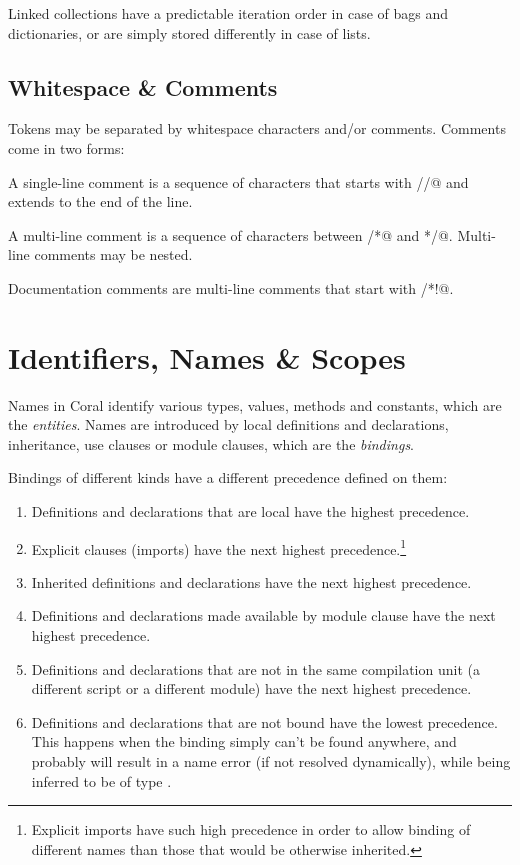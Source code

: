 Linked collections have a predictable iteration order in case of bags and dictionaries, or are simply stored differently in case of lists.  

\section{Whitespace \& Comments}\label{sec:whitespacecomments}

Tokens may be separated by whitespace characters and/or comments. Comments come in two forms: 

A single-line comment is a sequence of characters that starts with \lstinline@//@ and extends to the end of the line. 

A multi-line comment is a sequence of characters between \lstinline@/*@ and \lstinline@*/@. Multi-line comments may be nested. 

Documentation comments are multi-line comments that start with \lstinline@/*!@. 

\chapter{Identifiers, Names \& Scopes}

Names in Coral identify various types, values, methods and constants, which are the \emph{entities}. Names are introduced by local definitions and declarations, inheritance, use clauses or module clauses, which are the \emph{bindings}. 

Bindings of different kinds have a different precedence defined on them: 

\begin{enumerate}
\item Definitions and declarations that are local have the highest precedence. 
\item Explicit \lstinline@use@ clauses (imports) have the next highest precedence.\footnote{Explicit imports have such high precedence in order to allow binding of different names than those that would be otherwise inherited.} 
\item Inherited definitions and declarations have the next highest precedence. 
\item Definitions and declarations made available by module clause have the next highest precedence. 
\item Definitions and declarations that are not in the same compilation unit (a different script or a different module) have the next highest precedence. 
\item Definitions and declarations that are not bound have the lowest precedence. This happens when the binding simply can't be found anywhere, and probably will result in a name error (if not resolved dynamically), while being inferred to be of type \lstinline@Object@. 
\end{enumerate}

